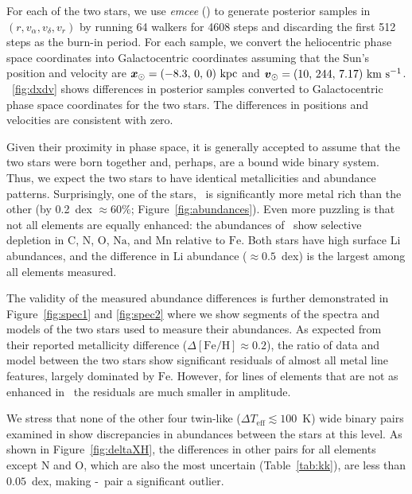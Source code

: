 \documentclass[modern, letterpaper]{aastex61}
\newcommand{\project}[1]{\textsl{#1}}
\newcommand{\figname}{Figure}
\newcommand*\elem[1]{\ensuremath{\mathrm{#1}}}
\newcommand*\elemH[1]{\ensuremath{[\mathrm{#1}/\elem{H}]}}
\newcommand*{\feh}{\ensuremath{\elemH{Fe}}}
\newcommand{\sunanalog}{\text{Krios}}
\newcommand{\bizarreone}{\text{Kronos}}
\newcommand{\bs}[1]{\boldsymbol{#1}}
\renewcommand{\vec}[1]{\bs{#1}}
\newcommand{\kms}{\ensuremath{\rm km~s^{-1}}}
\renewcommand\tablename{Table}
\begin{document}
%
For each of the two stars, we use \project{emcee}
(\citealt{2013PASP..125..306F}) to generate posterior samples in $(r, v_\alpha,
v_\delta, v_r)$ by running 64 walkers for 4608 steps and discarding the first
512 steps as the burn-in period.
For each sample, we convert the heliocentric phase space coordinates into
Galactocentric coordinates assuming that the Sun's position and velocity are
$\vec x_\odot = (-8.3,\,0,\,0)~{\rm kpc}$ and $\vec v_\odot = (10,\,244,\,7.17)~\kms$.
\figurename~\ref{fig:dxdv} shows differences in posterior samples converted to
Galactocentric phase space coordinates for the two stars.
The differences in positions and velocities are consistent with zero.

Given their proximity in phase space, it is generally accepted to assume that
the two stars were born together and, perhaps, are a bound wide binary system.
Thus, we expect the two stars to have identical metallicities and abundance patterns.
Surprisingly, one of the stars, \bizarreone\ is significantly more metal
rich than the other (by 0.2~dex $\approx 60\%$; \figname~\ref{fig:abundances}).
Even more puzzling is that not all elements are equally enhanced:
the abundances of \bizarreone\ show selective depletion in
\elem{C}, \elem{N}, \elem{O}, \elem{Na}, and \elem{Mn}
relative to \elem{Fe}.
Both stars have high surface \elem{Li} abundances, and the difference in
\elem{Li} abundance ($\approx 0.5$~dex) is the largest among all elements
measured.

The validity of the measured abundance differences is further demonstrated
in \figname~\ref{fig:spec1} and \ref{fig:spec2} where we show
segments of the spectra and models of the two stars
used to measure their abundances.
As expected from their reported metallicity difference ($\Delta\feh \approx 0.2$),
the ratio of data and model between the two stars show significant
residuals of almost all metal line features, largely dominated by \elem{Fe}.
However, for lines of elements that are not as enhanced in \bizarreone\,
the residuals are much smaller in amplitude.


We stress that none of the other four twin-like ($\Delta T_\mathrm{eff}
\lesssim 100$~K) wide binary pairs examined in \citealt{2016ApJS..225...32B}
show discrepancies in abundances between the stars at this level.
As shown in \figname~\ref{fig:deltaXH},
the differences in other pairs for all elements except \elem{N} and \elem{O},
which are also the most uncertain (\tablename~\ref{tab:kk}),
are less than $0.05$~dex, making \bizarreone-\sunanalog\ pair a significant outlier.
\end{document}
